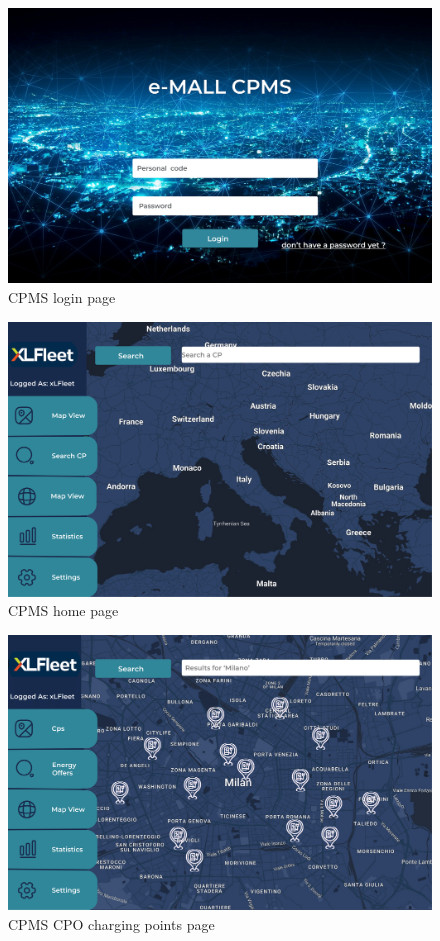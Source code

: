 \documentclass{Configuration_Files/PoliMi3i_thesis}
\begin{document}
\begin{figure}[H]
    \centering
    \includegraphics[width=1\textwidth]{Images/user-interface/cpms/CPMS-2.png}
    \caption{CPMS login page}
\end{figure}

\begin{figure}[H]
    \centering
    \includegraphics[width=1\textwidth]{Images/user-interface/cpms/CPMS-3.png}
    \caption{CPMS home page}
\end{figure}

\begin{figure}[H]
    \centering
    \includegraphics[width=1\textwidth]{Images/user-interface/cpms/CPMS-1.png}
    \caption{CPMS CPO charging points page}
\end{figure}
\end{document}
